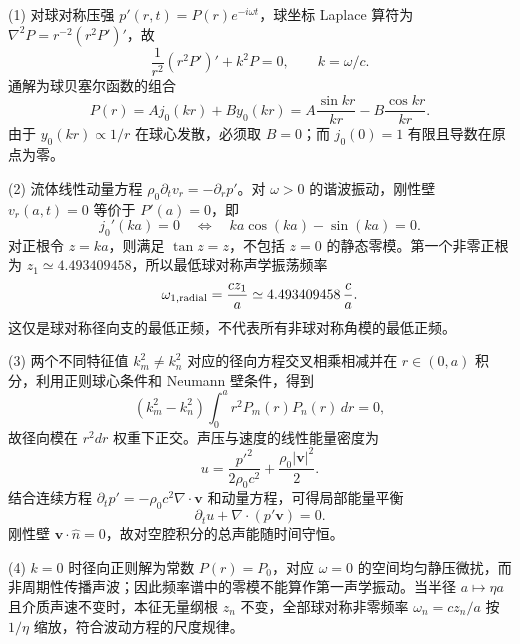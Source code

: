 (1) 对球对称压强 \(p'(r,t)=P(r)e^{-i\omega t}\)，球坐标 Laplace 算符为 \(\nabla^2P=r^{-2}(r^2P')'\)，故
\[
\frac1{r^2}(r^2P')'+k^2P=0,\qquad k=\omega/c.
\]
通解为球贝塞尔函数的组合
\[
P(r)=A j_0(kr)+B y_0(kr)
=A\frac{\sin kr}{kr}-B\frac{\cos kr}{kr}.
\]
由于 \(y_0(kr)\propto1/r\) 在球心发散，必须取 \(B=0\)；而 \(j_0(0)=1\) 有限且导数在原点为零。

(2) 流体线性动量方程 \(\rho_0\partial_t v_r=-\partial_r p'\)。对 \(\omega>0\) 的谐波振动，刚性壁 \(v_r(a,t)=0\) 等价于 \(P'(a)=0\)，即
\[
j_0'(ka)=0\quad\Longleftrightarrow\quad
ka\cos(ka)-\sin(ka)=0.
\]
对正根令 \(z=ka\)，则满足 \(\tan z=z\)，不包括 \(z=0\) 的静态零模。第一个非零正根为 \(z_1\simeq4.493409458\)，所以最低球对称声学振荡频率
\[
\omega_{1,\rm radial}=\frac{c z_1}{a}\simeq4.493409458\,\frac ca.
\]
这仅是球对称径向支的最低正频，不代表所有非球对称角模的最低正频。

(3) 两个不同特征值 \(k_m^2\ne k_n^2\) 对应的径向方程交叉相乘相减并在 \(r\in(0,a)\) 积分，利用正则球心条件和 Neumann 壁条件，得到
\[
(k_m^2-k_n^2)\int_0^a r^2P_m(r)P_n(r)\,dr=0,
\]
故径向模在 \(r^2dr\) 权重下正交。声压与速度的线性能量密度为
\[
u=\frac{p'^2}{2\rho_0c^2}+\frac{\rho_0|\boldsymbol v|^2}{2}.
\]
结合连续方程 \(\partial_tp'=-\rho_0c^2\nabla\cdot\boldsymbol v\) 和动量方程，可得局部能量平衡
\[
\partial_tu+\nabla\cdot(p'\boldsymbol v)=0.
\]
刚性壁 \(\boldsymbol v\cdot\hat n=0\)，故对空腔积分的总声能随时间守恒。

(4) \(k=0\) 时径向正则解为常数 \(P(r)=P_0\)，对应 \(\omega=0\) 的空间均匀静压微扰，而非周期性传播声波；因此频率谱中的零模不能算作第一声学振动。当半径 \(a\mapsto\eta a\) 且介质声速不变时，本征无量纲根 \(z_n\) 不变，全部球对称非零频率 \(\omega_n=c z_n/a\) 按 \(1/\eta\) 缩放，符合波动方程的尺度规律。
